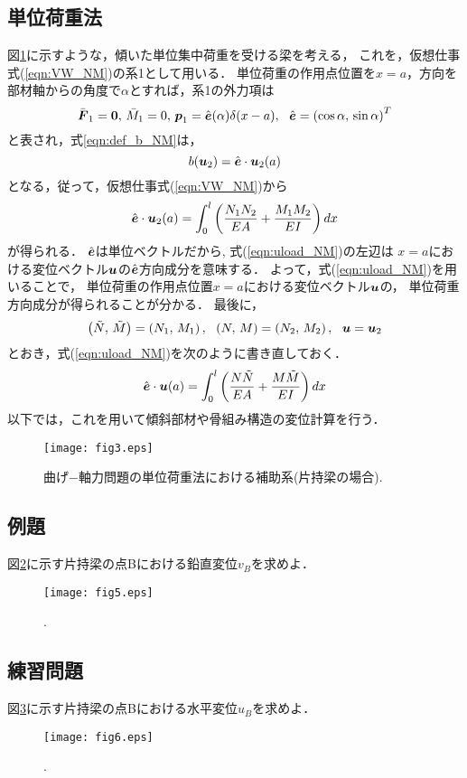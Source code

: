\documentclass[10pt,a4j]{jarticle}
\begin{document}
\subsection{単位荷重法}
図\ref{fig:fig3}に示すような，傾いた単位集中荷重を受ける梁を考える，
これを，仮想仕事式(\ref{eqn:VW_NM})の系1として用いる．
単位荷重の作用点位置を$x=a$，方向を部材軸からの角度で$\alpha$とすれば，系1の外力項は
\begin{equation}
	\bar{\fat{F}}_1=\fat{0},\, \bar M_1=0, \,
	\fat{p}_1=\hat{\fat{e}}(\alpha)\delta(x-a), \ \ 
	\hat{\fat{e}}=\left( \cos\alpha,\, \sin \alpha \right)^T
	\label{eqn:aux}
\end{equation}
と表され，式\ref{eqn:def_b_NM}は，
\begin{equation}
	b(\mbox{\boldmath $u$}_2)=\hat{\mbox{\boldmath $e$}}\cdot\mbox{\boldmath $u$}_2(a) 
	\label{eqn:dlt_smp}
\end{equation}
となる，従って，仮想仕事式(\ref{eqn:VW_NM})から
\begin{equation}
	\hat{\mbox{\boldmath $e$}}\cdot\mbox{\boldmath $u$}_2(a) 
	=
	\int_0^l \left( \frac{N_1N_2}{EA}+ \frac{M_1M_2}{EI} \right) dx 
	\label{eqn:uload_NM}
\end{equation}
が得られる．
$\hat{\mbox{\boldmath $e$}}$は単位ベクトルだから, 式(\ref{eqn:uload_NM})の左辺は
$x=a$における変位ベクトル$\mbox{\boldmath $u$}$の$\hat{\mbox{\boldmath $e$}}$方向成分を意味する．
よって，式(\ref{eqn:uload_NM})を用いることで，
単位荷重の作用点位置$x=a$における変位ベクトル$\mbox{\boldmath $u$}$の，
単位荷重方向成分が得られることが分かる．
最後に，
\begin{equation}
	\left( \tilde{N},\, \tilde{M}\right)= \left(N_1,\, M_1\right), \ \ 
	\left( N,\, M\right)= \left(N_2,\, M_2\right), \ \ \fat{u}=\fat{u}_2
	\label{eqn:}
\end{equation}
とおき，式(\ref{eqn:uload_NM})を次のように書き直しておく．
\begin{equation}
	\hat{\mbox{\boldmath $e$}}\cdot\mbox{\boldmath $u$}(a) 
	=
	\int_0^l \left( \frac{N \tilde N }{EA}+ \frac{M \tilde M }{EI} \right) dx 
	\label{eqn:uload_NM2}
\end{equation}
以下では，これを用いて傾斜部材や骨組み構造の変位計算を行う．
\begin{figure}[h]
	\begin{center}
	\texttt{[image: fig3.eps]} 
	\end{center}
	\caption{曲げ−軸力問題の単位荷重法における補助系(片持梁の場合).} 
	\label{fig:fig3}
\end{figure}
\subsection{例題}
図\ref{fig:fig5}に示す片持梁の点Bにおける鉛直変位$v_B$を求めよ．
\begin{figure}[h]
	\begin{center}
	\texttt{[image: fig5.eps]} 
	\end{center}
	\caption{.} 
	\label{fig:fig5}
\end{figure}
\subsection{練習問題}
図\ref{fig:fig6}に示す片持梁の点Bにおける水平変位$u_B$を求めよ．
\begin{figure}[h]
	\begin{center}
	\texttt{[image: fig6.eps]} 
	\end{center}
	\caption{.} 
	\label{fig:fig6}
\end{figure}
\end{document}
